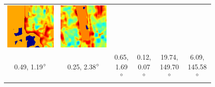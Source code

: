 \documentclass[twoside]{ctuthesis}
\theoremstyle{plain}
\theoremstyle{definition}
\theoremstyle{note}
\begin{document}
{\begin{figure}
{\begin{tabular}{c|c|c|c|c|c}
    \includegraphics[width=\thiswidth]{evaluation/queryPipeline/16.jpg/errmap} & 
    \includegraphics[width=\thiswidth]{evaluation/queryPipeline/26.jpg/errmap} \\[-1pt] 
    0.49, 1.19$\degree$ & 0.25, 2.38$\degree$ & 0.65, 1.69$\degree$ & 0.12, 0.07$\degree$ & 19.74, 149.70$\degree$ & 6.09, 145.58$\degree$ \\[1pt] \hline

\end{tabular}}
\end{figure}}
\end{document}
